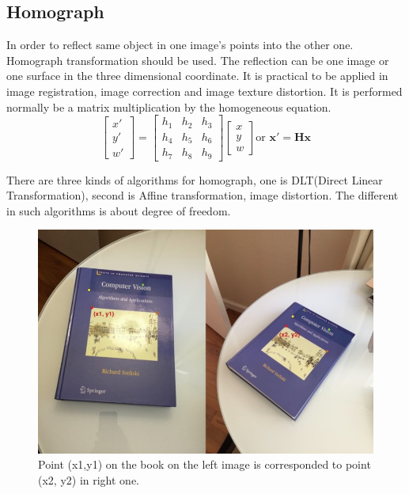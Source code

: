 \documentclass[senior]{IPSstyle}
\begin{document}
\subsection{Homograph}

In order to reflect same object in one image's points into the other one. 
Homograph transformation should be used.
The reflection can be one image or one surface in the three dimensional coordinate.
It is practical to be applied in image registration, image correction and image texture distortion.
It is performed normally be a matrix multiplication by the homogeneous equation.
\[\begin{bmatrix} x'\\ y'\\ w' \end{bmatrix} = \begin{bmatrix} h_1 & h_2 & h_3\\ h_4 & h_5&h_6 \\ h_7 & h_8 & h_9 \end{bmatrix} \begin{bmatrix} x\\ y\\ w \end{bmatrix} \text{or } \mathbf{x'= Hx}\]

There are three kinds of algorithms for homograph, one is DLT(Direct Linear Transformation), second is Affine transformation, image distortion.
The different in such algorithms is about degree of freedom. 

\begin{figure}[h!]
    \centering
    \includegraphics[width=15cm]{MasterThesis-master/images/homography_example.jpg}
    \caption{Point (x1,y1) on the book on the left image is corresponded to point (x2, y2) in right one.}
    \label{fig:homography_example}
\end{figure}
\end{document}
